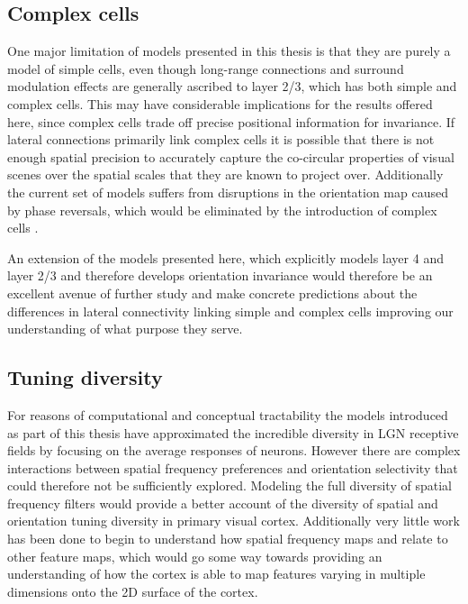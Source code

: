 \subsection{Complex cells}

One major limitation of models presented in this thesis is that they
are purely a model of simple cells, even though long-range connections
and surround modulation effects are generally ascribed to layer 2/3,
which has both simple and complex cells. This may have considerable
implications for the results offered here, since complex cells trade
off precise positional information for invariance. If lateral
connections primarily link complex cells it is possible that there is
not enough spatial precision to accurately capture the co-circular
properties of visual scenes over the spatial scales that they are
known to project over. Additionally the current set of models suffers
from disruptions in the orientation map caused by phase reversals,
which would be eliminated by the introduction of complex cells
\citep{Antolik2010}.

An extension of the models presented here, which explicitly models
layer 4 and layer 2/3 and therefore develops orientation invariance
would therefore be an excellent avenue of further study and make
concrete predictions about the differences in lateral connectivity
linking simple and complex cells improving our understanding of what
purpose they serve.

\subsection{Tuning diversity}

For reasons of computational and conceptual tractability the models
introduced as part of this thesis have approximated the incredible
diversity in LGN receptive fields by focusing on the average responses
of neurons. However there are complex interactions between spatial
frequency preferences and orientation selectivity that could therefore
not be sufficiently explored. Modeling the full diversity of spatial
frequency filters would provide a better account of the diversity of
spatial and orientation tuning diversity in primary visual
cortex. Additionally very little work has been done to begin to
understand how spatial frequency maps and relate to other feature
maps, which would go some way towards providing an understanding of
how the cortex is able to map features varying in multiple dimensions
onto the 2D surface of the cortex.

